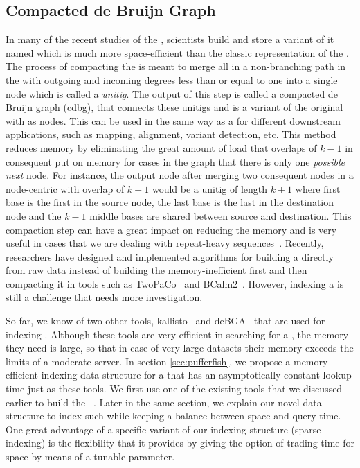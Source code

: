 \subsection{Compacted de Bruijn Graph}
\label{subsubsec:cdbg}
In many of the recent studies of the \dbg, scientists build and store a variant of it named \ccdbg which is much more space-efficient than the classic representation of the \dbg. The process of compacting the \dbg is meant to merge all \kmers in a non-branching path in the \dbg with outgoing and incoming degrees less than or equal to one into a single node which is called a \emph{unitig}. The output of this step is called a compacted de Bruijn graph (cdbg), that connects these unitigs and is a variant of the original \dbg with \kmers as nodes. This can be used in the same way as a \dbg for different downstream applications, such as mapping, alignment, variant detection, etc. This method reduces memory by eliminating the great amount of load that overlaps of $k-1$ in consequent \kmers put on memory for cases in the graph that there is only one \textit{possible next} node. For instance, the output node after merging two consequent nodes in a node-centric \dbg with overlap of $k-1$ would be a unitig of length $k+1$ where first base is the first in the source node, the last base is the last in the destination node and the $k-1$ middle bases are shared between source and destination. This compaction step can have a great impact on reducing the memory and is very useful in cases that we are dealing with repeat-heavy sequences~\cite{liu2016debga}. Recently, researchers have designed and implemented algorithms for building a \ccdbg directly from raw data instead of building the memory-inefficient \dbg first and then compacting it in tools such as TwoPaCo~\cite{minkin2016twopaco} and BCalm2~\cite{chikhi2016compacting}. However, indexing a \ccdbg is still a challenge that needs more investigation. 

So far, we know of two other tools, kallisto~\cite{Bray2016Kallisto} and deBGA~\cite{liu2016debga} that are used for indexing \ccdbgs. Although these tools are very efficient in searching for a \kmer, the memory they need is large, so that in case of very large datasets their memory exceeds the limits of a moderate server. In section \ref{sec:pufferfish}, we propose a memory-efficient indexing data structure for a \ccdbg that has an asymptotically constant \kmer lookup time just as these tools. We first use one of the existing tools that we discussed earlier to build the \ccdbg~\cite{minkin2016twopaco}. Later in the same section, we explain our novel data structure to index such \ccdbgs while keeping a balance between space and query time. One great advantage of a specific variant of our indexing structure (sparse indexing) is the flexibility that it provides by giving the option of trading time for space by means of a tunable parameter.

